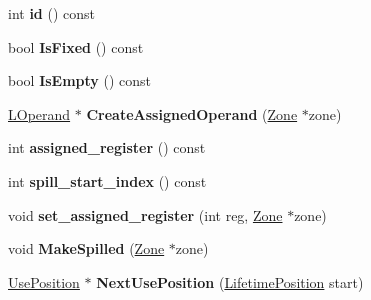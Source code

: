 \begin{DoxyCompactItemize}
\item 
\hypertarget{classv8_1_1internal_1_1_live_range_a430604744e4e7969978f9a2d529453f6}{}int {\bfseries id} () const \label{classv8_1_1internal_1_1_live_range_a430604744e4e7969978f9a2d529453f6}

\item 
\hypertarget{classv8_1_1internal_1_1_live_range_a7b5d29ff3e2e8f6eaf5953b29f54c832}{}bool {\bfseries Is\+Fixed} () const \label{classv8_1_1internal_1_1_live_range_a7b5d29ff3e2e8f6eaf5953b29f54c832}

\item 
\hypertarget{classv8_1_1internal_1_1_live_range_a6e8ff5be7527cb9da476bd90b0878220}{}bool {\bfseries Is\+Empty} () const \label{classv8_1_1internal_1_1_live_range_a6e8ff5be7527cb9da476bd90b0878220}

\item 
\hypertarget{classv8_1_1internal_1_1_live_range_a676d01f961a390f99adbcc835e53a98c}{}\hyperlink{classv8_1_1internal_1_1_l_operand}{L\+Operand} $\ast$ {\bfseries Create\+Assigned\+Operand} (\hyperlink{classv8_1_1internal_1_1_zone}{Zone} $\ast$zone)\label{classv8_1_1internal_1_1_live_range_a676d01f961a390f99adbcc835e53a98c}

\item 
\hypertarget{classv8_1_1internal_1_1_live_range_abb13cec2f1695536f2c3a44254e37ca0}{}int {\bfseries assigned\+\_\+register} () const \label{classv8_1_1internal_1_1_live_range_abb13cec2f1695536f2c3a44254e37ca0}

\item 
\hypertarget{classv8_1_1internal_1_1_live_range_a5633e3a40501abe85d9cfe33e72fb718}{}int {\bfseries spill\+\_\+start\+\_\+index} () const \label{classv8_1_1internal_1_1_live_range_a5633e3a40501abe85d9cfe33e72fb718}

\item 
\hypertarget{classv8_1_1internal_1_1_live_range_abc300a1903f048c375bf5697c6416093}{}void {\bfseries set\+\_\+assigned\+\_\+register} (int reg, \hyperlink{classv8_1_1internal_1_1_zone}{Zone} $\ast$zone)\label{classv8_1_1internal_1_1_live_range_abc300a1903f048c375bf5697c6416093}

\item 
\hypertarget{classv8_1_1internal_1_1_live_range_afa3bed04c2e4308815b2ead37912a2d3}{}void {\bfseries Make\+Spilled} (\hyperlink{classv8_1_1internal_1_1_zone}{Zone} $\ast$zone)\label{classv8_1_1internal_1_1_live_range_afa3bed04c2e4308815b2ead37912a2d3}

\item 
\hypertarget{classv8_1_1internal_1_1_live_range_afc986933638b3c59998735b687fea5e0}{}\hyperlink{classv8_1_1internal_1_1_use_position}{Use\+Position} $\ast$ {\bfseries Next\+Use\+Position} (\hyperlink{classv8_1_1internal_1_1_lifetime_position}{Lifetime\+Position} start)\label{classv8_1_1internal_1_1_live_range_afc986933638b3c59998735b687fea5e0}


\end{DoxyCompactItemize}
